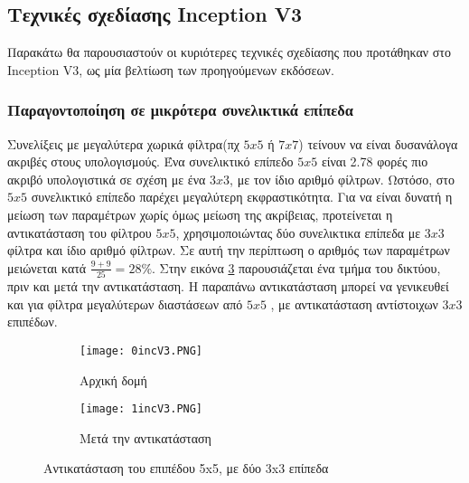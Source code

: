   
\subsection{Τεχνικές σχεδίασης Inception V3}
\label{subsec:3.3.2}
Παρακάτω θα παρουσιαστούν οι κυριότερες τεχνικές σχεδίασης που προτάθηκαν στο Inception V3, ως μία βελτίωση των προηγούμενων εκδόσεων.


\subsubsection{Παραγοντοποίηση σε μικρότερα συνελικτικά επίπεδα}
\label{subsubsec:3.3.2.1}
Συνελίξεις με μεγαλύτερα χωρικά φίλτρα(πχ $5x5$ ή $7x7$) τείνουν να είναι δυσανάλογα ακριβές στους υπολογισμούς. Ένα συνελικτικό επίπεδο $5x5$ είναι 2.78 φορές πιο ακριβό υπολογιστικά σε σχέση με ένα $3x3$, με τον ίδιο αριθμό φίλτρων. Ωστόσο, στο $5x5$ συνελικτικό επίπεδο παρέχει μεγαλύτερη εκφραστικότητα. Για να είναι δυνατή η μείωση των παραμέτρων χωρίς όμως μείωση της ακρίβειας, προτείνεται η αντικατάσταση του φίλτρου $5x5$, χρησιμοποιώντας δύο συνελικτικα επίπεδα με $3x3$ φίλτρα και ίδιο αριθμό φίλτρων. Σε αυτή την περίπτωση ο αριθμός των παραμέτρων μειώνεται κατά $\frac{9+9}{25} = 28\%$. Στην εικόνα \ref{figure:a1} παρουσιάζεται ένα τμήμα του δικτύου, πριν και μετά την αντικατάσταση. Η παραπάνω αντικατάσταση μπορεί να γενικευθεί και για φίλτρα μεγαλύτερων διαστάσεων από $5x5$ , με αντικατάσταση αντίστοιχων $3x3$ επιπέδων.


\begin{figure}[!h]
\centering
\begin{subfigure}{.5\textwidth}
  \centering
  \texttt{[image: 0incV3.PNG]}
  \caption{Αρχική δομή}
  \label{fig:sub11}
\end{subfigure}
\begin{subfigure}{.5\textwidth}
  \centering
  \texttt{[image: 1incV3.PNG]}
  \caption{Μετά την αντικατάσταση}
  \label{fig:sub21}
\end{subfigure}
\caption{Αντικατάσταση του επιπέδου 5x5, με δύο 3x3 επίπεδα}
\label{figure:a1}
\end{figure}



